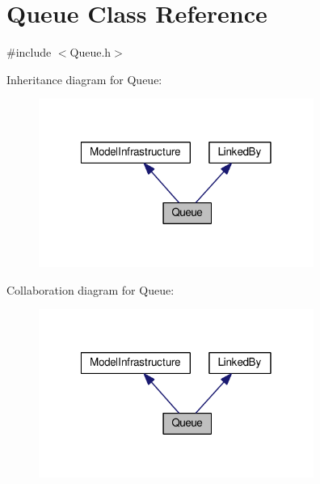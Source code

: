 \hypertarget{class_queue}{\section{Queue Class Reference}
\label{class_queue}
}


{\ttfamily \#include $<$Queue.\-h$>$}



Inheritance diagram for Queue\-:
\nopagebreak
\begin{figure}[H]
\begin{center}
\leavevmode
\includegraphics[width=255pt]{class_queue__inherit__graph}
\end{center}
\end{figure}


Collaboration diagram for Queue\-:
\nopagebreak
\begin{figure}[H]
\begin{center}
\leavevmode
\includegraphics[width=255pt]{class_queue__coll__graph}
\end{center}
\end{figure}
